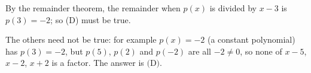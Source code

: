 By the remainder theorem, the remainder when $p(x)$ is divided by $x-3$ is $p(3)=-2$; so (D) must be true.

The others need not be true: for example $p(x)=-2$ (a constant polynomial) has $p(3)=-2$, but $p(5)$, $p(2)$ and $p(-2)$ are all $-2\ne0$, so none of $x-5$, $x-2$, $x+2$ is a factor. The answer is $\boxed{\text{(D)}}$.
